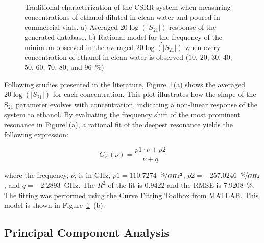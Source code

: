 \documentclass[journal,twoside,web]{ieeecolor}
\begin{document}
\begin{figure}[!t]
	\caption{Traditional characterization of the CSRR system when measuring concentrations of ethanol diluted in clean water and poured in commercial vials. a) Averaged $20\dot{\log\left(|S_{21}|\right)}$ response of the generated database. b) Rational model for the frequency of the minimum observed in the averaged $20\dot{\log\left(|S_{21}|\right)}$ when every concentration of ethanol in clean water is observed ($10$, $20$, $30$, $40$, $50$, $60$, $70$, $80$, and $96$~$\%$)}
	\label{fig:avgData}
	\vspace{-0.3cm}
\end{figure}

Following studies presented in the literature, Figure~\ref{fig:avgData}(a) shows the averaged $20\dot{\log\left(|S_{21}|\right)}$ for each concentration. This plot illustrates how the shape of the S$_{21}$ parameter evolves with concentration, indicating a non-linear response of the system to ethanol. By evaluating the frequency shift of the most prominent resonance in Figure\ref{fig:avgData}(a)\cite{Abdolrazzaghi2023}, a rational fit of the deepest resonance yields the following expression:

\begin{equation}
	\label{eq:frequFitt}
	 C_{\%}(\nu) = \frac{p1\cdot\nu+p2}{\nu+q} 
\end{equation} 

where the frequency, $\nu$, is in GHz, $p1 = 110.7274$~$\nicefrac{\%}{GHz^{2}}$, $p2 = -257.0246$~$\nicefrac{\%}{GHz}$, and $q = -2.2893$~GHz. The $R^{2}$ of the fit is $0.9422$ and the RMSE is $7.9208$~$\%$. The fitting was performed using the Curve Fitting Toolbox from MATLAB. This model is shown in Figure~\ref{fig:avgData}~(b).

\subsection{Principal Component Analysis}
\label{ssec:pcaAnalysis}
\end{document}
